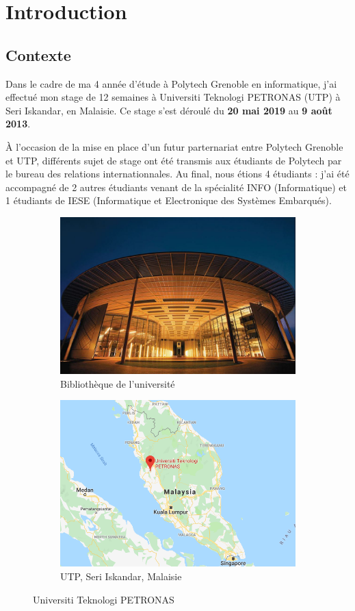 \chapter{Introduction}

\section{Contexte}

Dans le cadre de ma 4 année d'étude à Polytech Grenoble en informatique, j'ai effectué mon stage de 12 semaines à Universiti Teknologi PETRONAS (UTP) à Seri Iskandar, en Malaisie. Ce stage s'est déroulé du \textbf{20 mai 2019} au \textbf{9 août 2013}.

À l'occasion de la mise en place d'un futur parternariat entre Polytech Grenoble et UTP, différents sujet de stage ont été transmis aux étudiants de Polytech par le bureau des relations internationnales. Au final, nous étions 4 étudiants : j'ai été accompagné de 2 autres étudiants venant de la spécialité INFO (Informatique) et 1 étudiants de IESE (Informatique et Electronique des Systèmes Embarqués).


\begin{figure}[h]
  \centering
  \begin{subfigure}{.5\textwidth}
    \centering
    \includegraphics[width=.8\linewidth]{content/imgs/utp.jpg}
    \caption{Bibliothèque de l'université}
  \end{subfigure}%
  \begin{subfigure}{.5\textwidth}
    \centering
    \includegraphics[width=.8\linewidth]{content/imgs/map.png}
    \caption{UTP, Seri Iskandar, Malaisie}
  \end{subfigure}
  \caption{Universiti Teknologi PETRONAS}
\end{figure}




